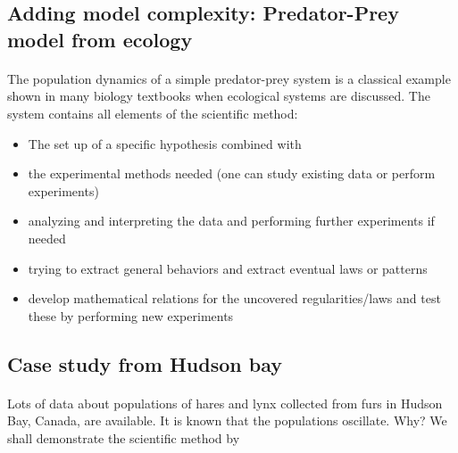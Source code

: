 \documentclass[%
twoside,                 %
final,                   %
10pt]{article}
\begin{document}
\noindent



\subsection*{Adding model complexity: Predator-Prey model from ecology}


\paragraph{}
The population dynamics of a simple predator-prey system is a
classical example shown in many biology textbooks when ecological
systems are discussed. The system contains all elements of the
scientific method:

\begin{itemize}
 \item The set up of a specific hypothesis combined with

 \item the experimental methods needed (one can study existing data or perform experiments)

 \item analyzing and interpreting the data and performing further experiments if needed

 \item trying to extract general behaviors and extract eventual laws or patterns

 \item develop mathematical relations for the uncovered regularities/laws and test these by performing new experiments
\end{itemize}

\noindent




\subsection*{Case study from Hudson bay}


\paragraph{}
Lots of data about populations of hares and lynx collected from furs in Hudson Bay, Canada, are available. It is known that the populations oscillate. Why?
We shall demonstrate the scientific method by
\end{document}

